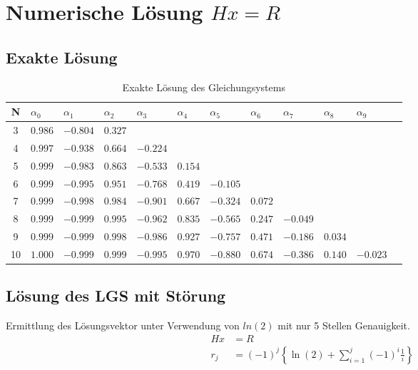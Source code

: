 \documentclass{beamer}
\begin{document}
  \section{Numerische Lösung $Hx=R$}
  \subsection{Exakte Lösung}
  \begin{frame}
    \centering    
    \begin{table}[htbp]
    \tiny   
    \renewcommand{\arraystretch}{1.5}
    \begin{tabularx}{\textwidth}{|c|X|X|X|X|X|X|X|X|X|X|X|}
        \hline    
        N & $\alpha_0$&$\alpha_1$&$\alpha_2$&$\alpha_3$&$\alpha_4$&$\alpha_5$&$\alpha_6$&$\alpha_7$&$\alpha_8$&$\alpha_9$ \\\hline
        3 & $0.986$ & $-0.804$ &  $0.327$ &&&&&&& \\\hline
        4 & $0.997$ & $-0.938$ &  $0.664$ & $-0.224$ &&&&&& \\\hline
        5 & $0.999$ & $-0.983$ &  $0.863$ & $-0.533$ &  $0.154$ &&&&& \\\hline
        6 & $0.999$ & $-0.995$ &  $0.951$ & $-0.768$ &  $0.419$ & $-0.105$ &&&& \\\hline
        7 & $0.999$ & $-0.998$ &  $0.984$ & $-0.901$ &  $0.667$ & $-0.324$ &  $0.072$ &&& \\\hline
        8 & $0.999$ & $-0.999$ &  $0.995$ & $-0.962$ &  $0.835$ & $-0.565$ &  $0.247$ & $-0.049$ && \\\hline
        9 & $0.999$ & $-0.999$ &  $0.998$ & $-0.986$ &  $0.927$ & $-0.757$ &  $0.471$ & $-0.186$ &  $0.034$ & \\\hline
        10 & $1.000$ & $-0.999$ &  $0.999$ & $-0.995$ &  $0.970$ & $-0.880$ &  $0.674$ & $-0.386$ &  $0.140$ & $-0.023$  \\\hline
    \end{tabularx}
    \caption{Exakte Lösung des Gleichungsystems}      
    \end{table}
  \end{frame}
  
  \subsection{Lösung des LGS mit Störung}
  \begin{frame}
    Ermittlung des Lösungsvektor unter Verwendung von $ln(2)$ mit nur 5 Stellen Genauigkeit.
    \begin{align}
      Hx&=R\\
      r_j&= (-1)^j \left\{ \ln(2) + \sum_{i=1}^j (-1)^i \frac{1}{i} \right\}
    \end{align}
   
  \end{frame}
  
\end{document}
